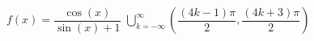 { $f(x) = \dfrac{\cos(x)}{\sin(x) + 1}$}
{ $\displaystyle \bigcup_{k=-\infty}^{\infty} \left( \dfrac{(4k - 1)\pi}{2}, \dfrac{(4k + 3)\pi}{2} \right)$}
